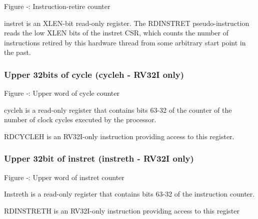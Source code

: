 \missingfigure{}

Figure ‑: Instruction-retire counter

instret is an XLEN-bit read-only register. The RDINSTRET
pseudo-instruction reads the low XLEN bits of the instret CSR, which
counts the number of instructions retired by this hardware thread from
some arbitrary start point in the past.

\subsubsection{Upper 32bits of cycle (cycleh - RV32I
only)}\label{upper-32bits-of-cycle-cycleh---rv32i-only}

\missingfigure{}

Figure ‑: Upper word of cycle counter

cycleh is a read-only register that contains bits 63-32 of the counter
of the number of clock cycles executed by the processor.

RDCYCLEH is an RV32I-only instruction providing access to this register.

\subsubsection{Upper 32bit of instret (instreth - RV32I
only)}\label{upper-32bit-of-instret-instreth---rv32i-only}

\missingfigure{}

Figure ‑: Upper word of instret counter

Instreth is a read-only register that contains bits 63-32 of the
instruction counter.

RDINSTRETH is an RV32I-only instruction providing access to this
register